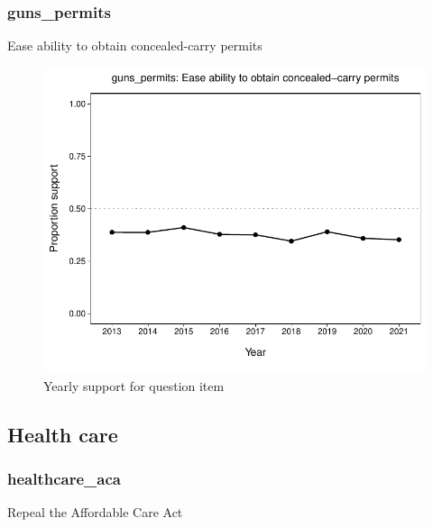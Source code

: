 \documentclass[
  12pt]{article}
\begin{document}
\hypertarget{guns_permits}{%
\subsubsection{guns\_permits}\label{guns_permits}}

Ease ability to obtain concealed-carry permits

\begin{figure}

{\centering \includegraphics{error-checking_files/figure-latex/unnamed-chunk-3-15} 

}

\caption{Yearly support for question item}\label{fig:unnamed-chunk-3-15}
\end{figure}

\newpage

\hypertarget{health-care}{%
\subsection{Health care}\label{health-care}}

\hypertarget{healthcare_aca}{%
\subsubsection{healthcare\_aca}\label{healthcare_aca}}

Repeal the Affordable Care Act
\end{document}
